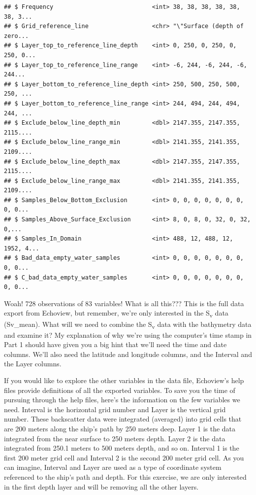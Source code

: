 \documentclass[]{article}
\begin{document}
\begin{verbatim}
## $ Frequency                            <int> 38, 38, 38, 38, 38, 38, 3...
## $ Grid_reference_line                  <chr> "\"Surface (depth of zero...
## $ Layer_top_to_reference_line_depth    <int> 0, 250, 0, 250, 0, 250, 0...
## $ Layer_top_to_reference_line_range    <int> -6, 244, -6, 244, -6, 244...
## $ Layer_bottom_to_reference_line_depth <int> 250, 500, 250, 500, 250, ...
## $ Layer_bottom_to_reference_line_range <int> 244, 494, 244, 494, 244, ...
## $ Exclude_below_line_depth_min         <dbl> 2147.355, 2147.355, 2115....
## $ Exclude_below_line_range_min         <dbl> 2141.355, 2141.355, 2109....
## $ Exclude_below_line_depth_max         <dbl> 2147.355, 2147.355, 2115....
## $ Exclude_below_line_range_max         <dbl> 2141.355, 2141.355, 2109....
## $ Samples_Below_Bottom_Exclusion       <int> 0, 0, 0, 0, 0, 0, 0, 0, 0...
## $ Samples_Above_Surface_Exclusion      <int> 8, 0, 8, 0, 32, 0, 32, 0,...
## $ Samples_In_Domain                    <int> 488, 12, 488, 12, 1952, 4...
## $ Bad_data_empty_water_samples         <int> 0, 0, 0, 0, 0, 0, 0, 0, 0...
## $ C_bad_data_empty_water_samples       <int> 0, 0, 0, 0, 0, 0, 0, 0, 0...
\end{verbatim}

Woah! 728 observations of 83 variables! What is all this??? This is the
full data export from Echoview, but remember, we're only interested in
the S\textsubscript{v} data (Sv\_mean). What will we need to combine the
S\textsubscript{v} data with the bathymetry data and examine it? My
explanation of why we're using the computer's time stamp in Part 1
should have given you a big hint that we'll need the time and date
columns. We'll also need the latitude and longitude columns, and the
Interval and the Layer columns.

If you would like to explore the other variables in the data file,
Echoview's help files provide definitions of all the exported variables.
To save you the time of pursuing through the help files, here's the
information on the few variables we need. Interval is the horizontal
grid number and Layer is the vertical grid number. These backscatter
data were integrated (averaged) into grid cells that are 200 meters
along the ship's path by 250 meters deep. Layer 1 is the data integrated
from the near surface to 250 meters depth. Layer 2 is the data
integrated from 250.1 meters to 500 meters depth, and so on. Interval 1
is the first 200 meter grid cell and Interval 2 is the second 200 meter
grid cell. As you can imagine, Interval and Layer are used as a type of
coordinate system referenced to the ship's path and depth. For this
exercise, we are only interested in the first depth layer and will be
removing all the other layers.
\end{document}
